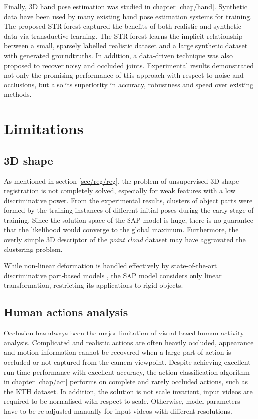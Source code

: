 Finally, 3D hand pose estimation was studied in chapter \ref{chap/hand}. Synthetic data have been used by many existing hand pose estimation systems for training. The proposed STR forest captured the benefits of both realistic and synthetic data via transductive learning. The STR forest learns the implicit relationship between a small, sparsely labelled realistic dataset and a large synthetic dataset with generated groundtruths. In addition, a data-driven technique was also proposed to recover noisy and occluded joints. Experimental results demonstrated not only the promising performance of this approach with respect to noise and occlusions, but also its superiority in accuracy, robustness and speed over existing methods.

\section{Limitations}

\subsection{3D shape} 

As mentioned in section \ref{sec/reg/reg}, the problem of unsupervised 3D shape registration is not completely solved, especially for weak features with a low discriminative power. From the experimental results, clusters of object parts were formed by the training instances of different initial poses during the early stage of training. Since the solution space of the SAP model is huge, there is no guarantee that the likelihood would converge to the global maximum. Furthermore, the overly simple 3D descriptor of the \emph{point cloud} dataset may have aggravated the clustering problem.   

While non-linear deformation is handled effectively by state-of-the-art discriminative part-based models \cite{Felzenszwalb2010, Andriluka2009, Pishchulin2012}, the SAP model considers only linear transformation, restricting its applications to rigid objects. 

\subsection{Human actions analysis} 

Occlusion has always been the major limitation of visual based human activity analysis. Complicated and realistic actions are often heavily occluded, appearance and motion information cannot be recovered when a large part of action is occluded or not captured from the camera viewpoint. Despite achieving excellent run-time performance with excellent accuracy, the action classification algorithm in chapter \ref{chap/act} performs on complete and rarely occluded actions, such as the KTH dataset. In addition, the solution is not scale invariant, input videos are required to be normalised with respect to scale. Otherwise, model parameters have to be re-adjusted manually for input videos with different resolutions.  

